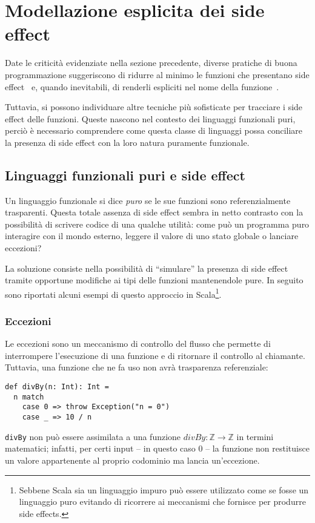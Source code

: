 \section{Modellazione esplicita dei side effect}
\label{modellazione-esplicita-dei-side-effect}

Date le criticità evidenziate nella sezione precedente, diverse pratiche di buona programmazione suggeriscono di ridurre al minimo le funzioni che presentano side effect~\cite[p.~44]{cit:clean-code-a-handbook-of-agile-software-craftsmanship} e, quando inevitabili, di renderli espliciti nel nome della funzione~\cite[p.~313]{cit:clean-code-a-handbook-of-agile-software-craftsmanship}.

Tuttavia, si possono individuare altre tecniche più sofisticate per tracciare i side effect delle funzioni.
Queste nascono nel contesto dei linguaggi funzionali puri, perciò è necessario comprendere come questa classe di linguaggi possa conciliare la presenza di side effect con la loro natura puramente funzionale.

\subsection{Linguaggi funzionali puri e side effect}
\label{linguaggi-funzionali-puri-e-side-effect}
Un linguaggio funzionale si dice \emph{puro} se le sue funzioni sono referenzialmente trasparenti.
Questa totale assenza di side effect sembra in netto contrasto con la possibilità di scrivere codice di una qualche utilità: come può un programma puro interagire con il mondo esterno, leggere il valore di uno stato globale o lanciare eccezioni?

La soluzione consiste nella possibilità di ``simulare'' la presenza di side effect tramite opportune modifiche ai tipi delle funzioni mantenendole pure.
In seguito sono riportati alcuni esempi di questo approccio in Scala\footnote{Sebbene Scala sia un linguaggio impuro può essere utilizzato come se fosse un linguaggio puro evitando di ricorrere ai meccanismi che fornisce per produrre side effects.}.

\subsubsection{Eccezioni}
\label{eccezioni}
Le eccezioni sono un meccanismo di controllo del flusso che permette di interrompere l'esecuzione di una funzione e di ritornare il controllo al chiamante.
Tuttavia, una funzione che ne fa uso non avrà trasparenza referenziale:
\begin{lstlisting}[language=scala3]
def divBy(n: Int): Int =
  n match
    case 0 => throw Exception("n = 0")
    case _ => 10 / n
\end{lstlisting}
\lstinline|divBy| non può essere assimilata a una funzione $divBy : \mathbb{Z} \rightarrow \mathbb{Z}$ in termini matematici; infatti, per certi input -- in questo caso 0 -- la funzione non restituisce un valore appartenente al proprio codominio ma lancia un'eccezione.

